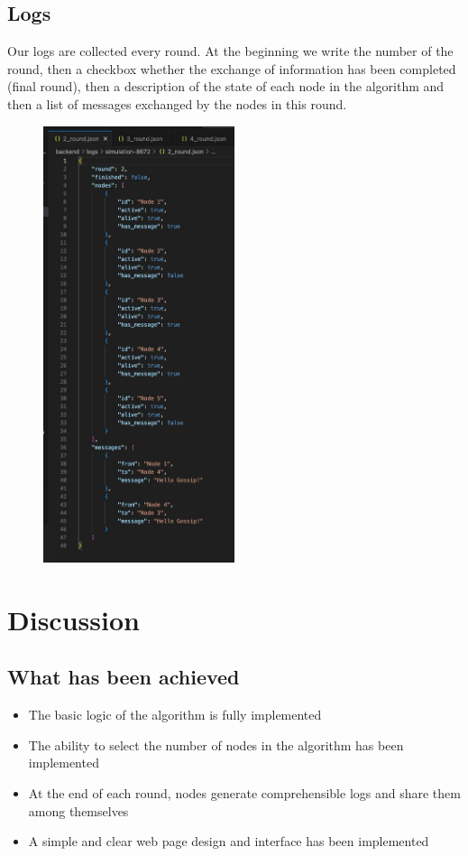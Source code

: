 \documentclass[a4paper,12pt]{article}
\begin{document}
\subsection{Logs}
Our logs are collected every round. At the beginning we write the number of the round, then a checkbox whether the exchange of information has been completed (final round), then a description of the state of each node in the algorithm and then a list of messages exchanged by the nodes in this round. 
\begin{figure}[H]
    \centering
    \includegraphics[width=0.5\textwidth]{figures/logs.jpg}
    \label{fig:screenshot1}
\end{figure}

\section{Discussion}

\subsection{What has been achieved}
\begin{itemize}
    \item The basic logic of the algorithm is fully implemented
    \item The ability to select the number of nodes in the algorithm has been implemented
    \item At the end of each round, nodes generate comprehensible logs and share them among themselves
    \item A simple and clear web page design and interface has been implemented
\end{itemize}
\end{document}
